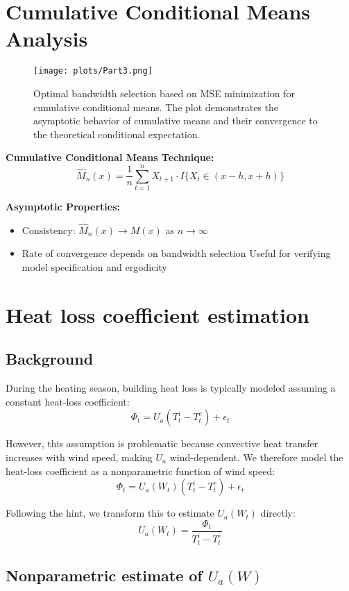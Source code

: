 \documentclass{article}
\begin{document}
\section{Cumulative Conditional Means Analysis}

\begin{figure}[H]
\centering
\texttt{[image: plots/Part3.png]}
\caption{Optimal bandwidth selection based on MSE minimization for cumulative conditional means. The plot demonstrates the asymptotic behavior of cumulative means and their convergence to the theoretical conditional expectation.}
\label{fig:cumulative_means}
\end{figure}

\textbf{Cumulative Conditional Means Technique:}
\[
\hat{M}_n(x) = \frac{1}{n} \sum_{t=1}^n X_{t+1} \cdot I\{X_t \in (x-h, x+h)\}
\]

\textbf{Asymptotic Properties:}
\begin{itemize}
\item Consistency: $\hat{M}_n(x) \xrightarrow{} M(x)$ as $n \to \infty$
\item Rate of convergence depends on bandwidth selection
 Useful for verifying model specification and ergodicity
\end{itemize}

\newpage

\section{Heat loss coefficient estimation}

\subsection{Background}

During the heating season, building heat loss is typically modeled assuming a constant heat-loss coefficient:
\[
\Phi_t = U_a(T^i_t - T^e_t) + \epsilon_t
\]

However, this assumption is problematic because convective heat transfer increases with wind speed, making $U_a$ wind-dependent. We therefore model the heat-loss coefficient as a nonparametric function of wind speed:
\[
\Phi_t = U_a(W_t)(T^i_t - T^e_t) + \epsilon_t
\]

Following the hint, we transform this to estimate $U_a(W_t)$ directly:
\[
U_a(W_t) = \frac{\Phi_t}{T^i_t - T^e_t}
\]

\subsection{Nonparametric estimate of $U_a(W)$}
\end{document}
